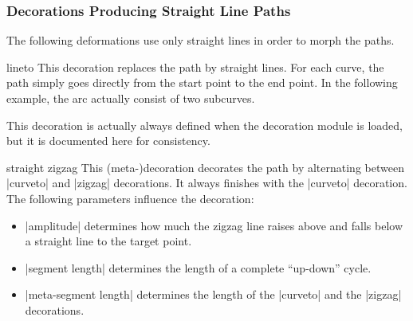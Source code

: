 \subsubsection{Decorations Producing Straight Line Paths}

The following deformations use only straight lines in order to morph the paths.

\begin{decoration}{lineto}
    This decoration replaces the path by straight lines. For each curve, the
    path simply goes directly from the start point to the end point. In the
    following example, the arc actually consist of two subcurves.

    This decoration is actually always defined when the decoration module is
    loaded, but it is documented here for consistency.
\begin{codeexample}[preamble={\usetikzlibrary{decorations}}]
\end{codeexample}
\end{decoration}

\begin{decoration}{straight zigzag}
    This (meta-)decoration decorates the path by alternating between |curveto|
    and |zigzag| decorations. It always finishes with the |curveto| decoration.
    The following parameters influence the decoration:
    \begin{itemize}
        \item |amplitude| determines how much the zigzag line raises above and
            falls below a straight line to the target point.
        \item |segment length| determines the length of a complete ``up-down''
            cycle.
    \item |meta-segment length| determines the length of the |curveto| and the
        |zigzag| decorations.
    \end{itemize}
\begin{codeexample}[preamble={\usetikzlibrary{decorations.pathmorphing}}]
\end{codeexample}
\end{decoration}

